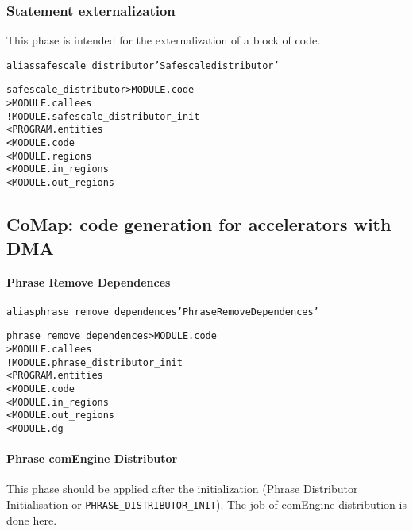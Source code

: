 \documentclass[a4paper]{report}
\newenvironment{PipsMake}{\begin{alltt}}{\end{alltt}}
\begin{document}
\subsubsection{Statement externalization}

This phase is intended for the externalization of a block of code.

\begin{PipsMake}
alias safescale_distributor 'Safescale distributor'

safescale_distributor                  > MODULE.code
                                       > MODULE.callees             
        ! MODULE.safescale_distributor_init
        < PROGRAM.entities
        < MODULE.code
        < MODULE.regions
        < MODULE.in_regions
        < MODULE.out_regions
\end{PipsMake}

\subsection{CoMap: code generation for accelerators with DMA}
\label{sec:comap:-code}

\paragraph{Phrase Remove Dependences}

\begin{PipsMake}
alias phrase_remove_dependences 'Phrase Remove Dependences'

phrase_remove_dependences                      > MODULE.code
                                               > MODULE.callees
        ! MODULE.phrase_distributor_init
        < PROGRAM.entities
        < MODULE.code
        < MODULE.in_regions
        < MODULE.out_regions
        < MODULE.dg
\end{PipsMake}


\paragraph{Phrase comEngine Distributor}

This phase should be applied after the initialization (Phrase Distributor
Initialisation or \verb|PHRASE_DISTRIBUTOR_INIT|). The job of comEngine
distribution is done here.
\end{document}
